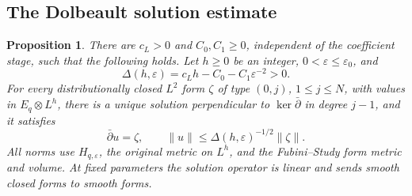 \documentclass[11pt,reqno]{amsart}
\numberwithin{equation}{section}
\newtheorem{proposition}[theorem]{Proposition}
\theoremstyle{definition}
\theoremstyle{remark}
\begin{document}
\subsection{The Dolbeault solution estimate}

\begin{proposition}\label{ana:positive-gap}
There are $c_L>0$ and $C_0,C_1\geq0$, independent of the coefficient
stage, such that the following holds.  Let $h\geq0$ be an integer,
$0<\varepsilon\leq\varepsilon_0$, and
\[
 \Delta(h,\varepsilon)
 =c_Lh-C_0-C_1\varepsilon^{-2}>0.
\]
For every distributionally closed $L^2$ form $\zeta$ of type $(0,j)$,
$1\leq j\leq N$, with values in $E_q\otimes L^h$, there is a
unique solution perpendicular to $\ker\bar\partial$ in degree $j-1$,
and it satisfies
\begin{equation}\label{ana:solver}
 \bar\partial u=\zeta,
 \qquad
 \|u\|\leq\Delta(h,\varepsilon)^{-1/2}\|\zeta\|.
\end{equation}
All norms use $H_{q,\varepsilon}$, the original metric on $L^h$,
and the Fubini--Study form metric and volume.  At fixed parameters
the solution operator is linear and sends smooth closed forms to
smooth forms.
\end{proposition}
\end{document}

